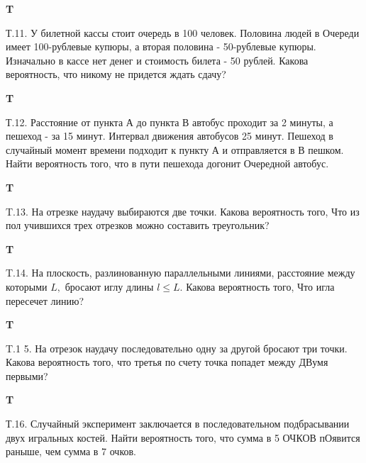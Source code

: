 \documentclass[a4paper,12pt]{article} %
\begin{document}
\begin{example}\textbf{T}

Т.11. У билетной кассы стоит очередь в 100 человек. Половина людей в
Очереди имеет 100-рублевые купюры, а вторая половина - 50-рублевые купюры. Изначально в кассе нет денег и стоимость билета - 50 рублей. Какова вероятность, что никому не придется ждать сдачу?


\end{example}


\begin{example}\textbf{T}

Т.12. Расстояние от пункта А до пункта В автобус проходит за 2 минуты, а пешеход - за 15 минут. Интервал движения автобусов 25 минут. Пешеход в случайный момент времени подходит к пункту А и отправляется в В пешком. Найти вероятность того, что в пути пешехода догонит
Очередной автобус.


\end{example}


\begin{example}\textbf{T}

T.13. На отрезке наудачу выбираются две точки. Какова вероятность того, Что из пол учившихся трех отрезков можно составить треугольник?


\end{example}




\begin{example}\textbf{T}

T.14. На плоскость, разлинованную параллельными линиями, расстояние между которыми $L,$ бросают иглу длины $l \leqslant L .$ Какова вероятность
того, Что игла пересечет линию?


\end{example}


\begin{example}\textbf{T}

T.1 5. На отрезок наудачу последовательно одну за другой бросают три точки. Какова вероятность того, что третья по счету точка попадет между ДВумя первыми?


\end{example}





\begin{example}\textbf{T}

Т.16. Случайный эксперимент заключается в последовательном подбрасывании двух игральных костей. Найти вероятность того, что сумма в 5 ОЧКОВ пОявится раныше, чем сумма в 7 очков.

\end{example}
\end{document}
